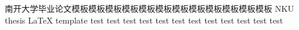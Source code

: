 \thesistitle
{南开大学毕业论文模板模板模板模板模板模板模板模板模板模板模板模板}
{NKU thesis \LaTeX{} template test test test test test test test test test test test test}
